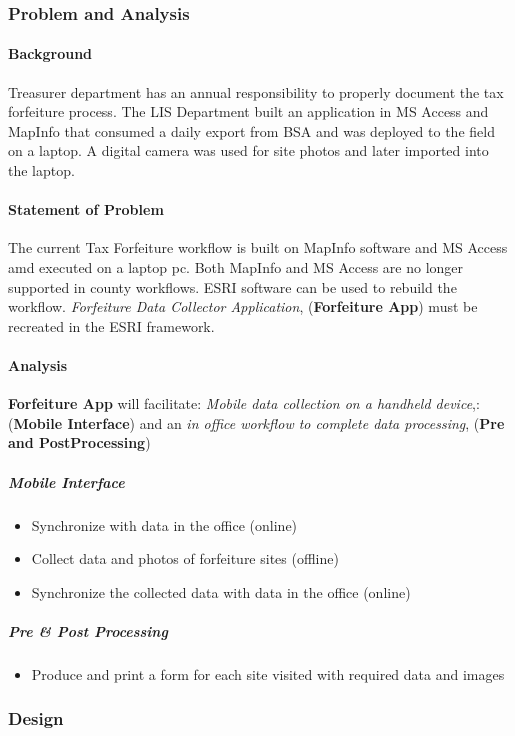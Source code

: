 \documentclass[class=book , crop=false, titlepage, twoside, multi={itemize, figure, verbatim}, float=false]{standalone}
\begin{document}
\subsubsection{Problem and Analysis}
%
\begin{multicols}{2}
\paragraph{Background}
%
\noindent Treasurer department has an annual responsibility to properly document the tax forfeiture process.  The LIS Department built an application in MS Access and MapInfo that consumed a daily export from BSA and was deployed to the field on a laptop.  A digital camera was used for site photos and later imported into the laptop.
%
\paragraph{Statement of Problem}
%
\noindent The current Tax Forfeiture workflow is built on MapInfo software and MS Access amd executed on a laptop pc.  Both MapInfo and MS Access are no longer supported in county workflows.  ESRI software can be used to rebuild the workflow.  \textit{Forfeiture Data Collector Application}, (\textbf{Forfeiture App}) must be recreated in the ESRI framework.
%
\paragraph{Analysis}
%
\noindent \textbf{Forfeiture App} will facilitate: \textit{Mobile data collection on a handheld device},: (\textbf{Mobile Interface}) and an \textit{in office workflow to complete data processing}, (\textbf{Pre and PostProcessing})
%
\subparagraph*{Mobile Interface}
%
\begin{itemize} %
%
\item Synchronize with data in the office (online)
%
\item Collect data and photos of forfeiture sites (offline)
%
\item Synchronize the collected data with data in the office (online)
%
\end{itemize} %
%
\subparagraph*{Pre \& Post Processing}
%
\begin{itemize} %
%
\item Produce and print a form for each site visited with required data and images
%
\end{itemize} %
%
\end{multicols}
%
\clearpage
%
\subsubsection{Design}
\end{document}
